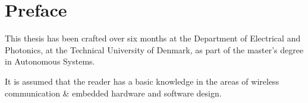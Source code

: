 \section*{Preface}
This thesis has been crafted over six months at the Department of Electrical and Photonics, at the Technical University of Denmark, as part of the master's degree in Autonomous Systems.

It is assumed that the reader has a basic knowledge in the areas of wireless communication \& embedded hardware and software design.